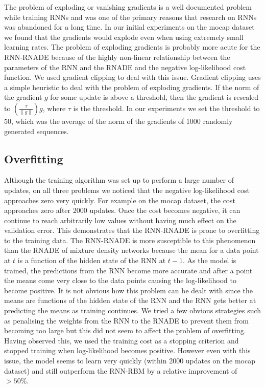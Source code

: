 \documentclass{article} %
\begin{document}
The problem of exploding or vanishing gradients is a well documented problem while training RNNs and was one of the primary reasons that research on RNNs was abandoned for a long time. In our initial experiments on the mocap dataset we found that the gradients would explode even when using extremely small learning rates. The problem of exploding gradients is probably more acute for the RNN-RNADE because of the highly non-linear relationship between the parameters of the RNN and the RNADE and the negative log-likelihood cost function. We used gradient clipping \cite{bengio2012advances} to deal with this issue. Gradient clipping uses a simple heuristic to deal with the problem of exploding gradients. If the norm of the gradient $g$ for some update is above a threshold, then the gradient is rescaled to $(\frac{\tau}{\left\lVert g \right\rVert})g$, where $\tau$ is the threshold. In our experiments we set the threshold to 50, which was the average of the norm of the gradients of 1000 randomly generated sequences. 

\subsection{Overfitting}
 Although the training algorithm was set up to perform a large number of updates, on all three problems we noticed that the negative log-likelihood cost approaches zero very quickly. For example on the mocap dataset, the cost approaches zero after 2000 updates. Once the cost becomes negative, it can continue to reach arbitrarily low values without having much effect on the validation error. This demonstrates that the RNN-RNADE is prone to overfitting to the training data. The RNN-RNADE is more susceptible to this phenomenon than the RNADE of mixture density networks because the mean for a data point at $t$ is a function of the hidden state of the RNN at $t-1$. As the model is trained, the predictions from the RNN become more accurate and after a point the means come very close to the data points causing the log-likelihood to become positive. It is not obvious how this problem can be dealt with since the means are functions of the hidden state of the RNN and the RNN gets better at predicting the means as training continues. We tried a few obvious strategies such as penalising the weights from the RNN to the RNADE to prevent them from becoming too large but this did not seem to affect the problem of overfitting. Having observed this, we used the training cost as a stopping criterion and stopped training when log-likelihood becomes positive. However even with this issue, the model seems to learn very quickly (within 2000 updates on the mocap dataset) and still outperform the RNN-RBM by a relative improvement of $> 50\%$. 
\end{document}
